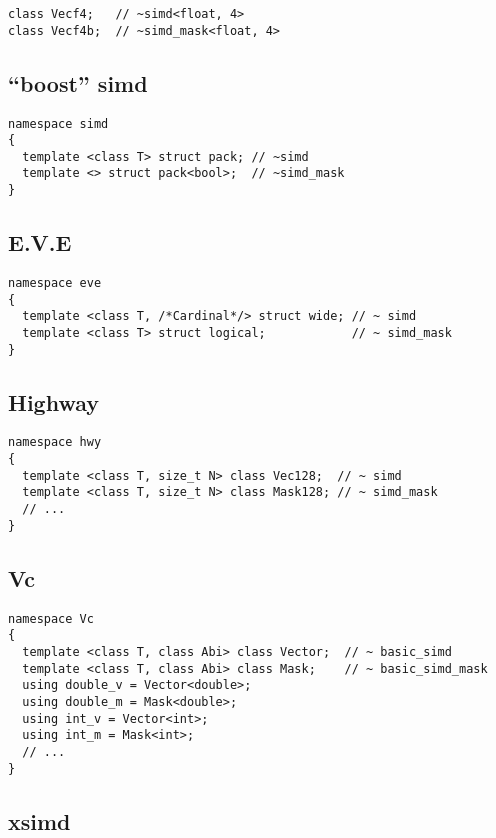 \medskip\begin{lstlisting}
class Vecf4;   // ~simd<float, 4>
class Vecf4b;  // ~simd_mask<float, 4>
\end{lstlisting}


\subsection{“boost” simd}

\medskip\begin{lstlisting}
namespace simd
{
  template <class T> struct pack; // ~simd
  template <> struct pack<bool>;  // ~simd_mask
}
\end{lstlisting}

\subsection{E.V.E}

\medskip\begin{lstlisting}
namespace eve
{
  template <class T, /*Cardinal*/> struct wide; // ~ simd
  template <class T> struct logical;            // ~ simd_mask
}
\end{lstlisting}

\subsection{Highway}

\medskip\begin{lstlisting}[style=Vc]
namespace hwy
{
  template <class T, size_t N> class Vec128;  // ~ simd
  template <class T, size_t N> class Mask128; // ~ simd_mask
  // ...
}
\end{lstlisting}


\subsection{Vc}

\medskip\begin{lstlisting}
namespace Vc
{
  template <class T, class Abi> class Vector;  // ~ basic_simd
  template <class T, class Abi> class Mask;    // ~ basic_simd_mask
  using double_v = Vector<double>;
  using double_m = Mask<double>;
  using int_v = Vector<int>;
  using int_m = Mask<int>;
  // ...
}
\end{lstlisting}

\subsection{xsimd}

